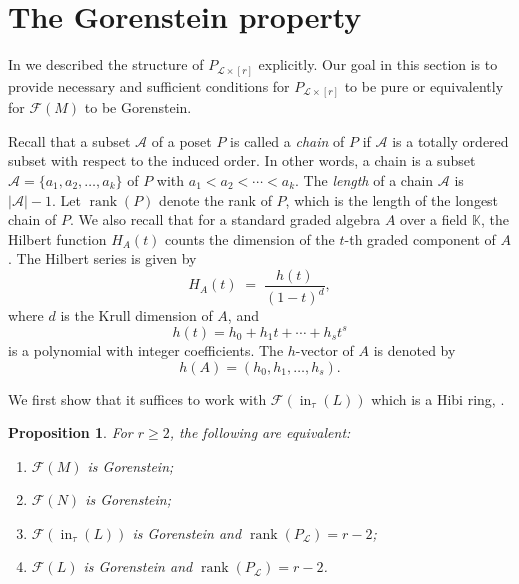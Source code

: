 \documentclass[11pt,a4paper,reqno,dvipsnames]{amsart}
\theoremstyle{plain}
\newtheorem{Proposition}[Theorem]{Proposition}
\theoremstyle{definition}
\newtheorem{Assumptions and Discussion}[Theorem]{Assumptions and Discussion}
\theoremstyle{remark}
\def\ini{\operatorname{in}}
\def\KK{{\mathbb K}}
\newcommand\calA{\mathcal{A}}
\newcommand\calF{\mathcal{F}}
\newcommand\calL{\mathcal{L}}
\newcommand{\rank}{\operatorname{rank}}
\newcommand{\Lr}{\ensuremath{\calL\times[r]}}
\begin{document}
\section{The Gorenstein property}\label{sec:GR}

In  we described the structure of $P_{\Lr}$ explicitly. Our goal in this section is to provide necessary and sufficient conditions for $P_{\Lr}$ to be pure or equivalently for $\calF(M)$ to be Gorenstein.

Recall that  a subset $\calA$ of a poset $P$ is called a
\emph{chain} of $P$ if $\calA$ is a totally ordered subset with respect to the induced order. In other
words, a chain is a subset $\calA = \{a_1,a_2,\ldots, a_k\}$ of $P$ with $a_1 < a_2 <\cdots < a_k$.
The \emph{length} of a chain $\calA$ is $|\calA|-1$. Let $\rank(P)$ denote the rank of $P$, which is the length of the longest chain of $P$. We also recall that for a standard graded algebra $A$ over a field $\KK$, the Hilbert function $H_A(t)$  counts the dimension of the $t$-th graded component of $A$. The Hilbert series is given by  
\[
   H_A(t) \;=\; \frac{h(t)}{(1-t)^d},
\]
where $d$ is the Krull dimension of $A$, and 
\[
   h(t) = h_0 + h_1 t + \cdots + h_s t^s
\]
is a polynomial with integer coefficients. The $h$-vector of $A$ is denoted by  
\[
   h(A) = (h_0, h_1, \ldots, h_s).
\]

We first show that it suffices to work with $\calF(\ini_{\tau}(L))$ which is a Hibi ring, .


\begin{Proposition}\label{r=1tor}
For $r\ge 2$, the following are equivalent:
      \begin{enumerate}[a]
          \item $ \calF(M)$ is Gorenstein;
          \item $\calF(N)$ is Gorenstein;
          \item $\calF(\ini_{\tau}(L))$ is Gorenstein and $\rank (P_{\calL})=r-2$;
          \item $ \calF(L)$ is Gorenstein and $\rank (P_{\calL})=r-2$.
      \end{enumerate}     
\end{Proposition}
\end{document}
